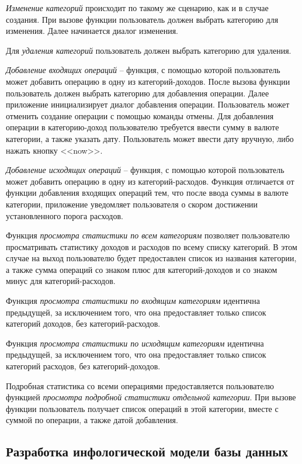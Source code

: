 \emph{Изменение категорий} происходит по такому же сценарию, как и в случае создания. При вызове функции пользователь должен выбрать категорию для изменения. Далее начинается диалог изменения.

Для \emph{удаления категорий} пользователь должен выбрать категорию для удаления.

\emph{Добавление входящих операций} -- функция, с помощью которой пользователь может добавить операцию в одну из категорий-доходов. После вызова функции пользователь должен выбрать категорию для добавления операции. Далее приложение инициализирует диалог добавления операции. Пользователь может отменить создание операции с помощью команды отмены. Для добавления операции в категорию-доход пользователю требуется ввести сумму в валюте категории, а также указать дату. Пользователь может ввести дату вручную, либо нажать кнопку <<now>>.

\emph{Добавление исходящих операций} -- функция, с помощью которой пользователь может добавить операцию в одну из категорий-расходов. Функция отличается от функции добавления входящих операций тем, что после ввода суммы в валюте категории, приложение уведомляет пользователя о скором достижении установленного порога расходов.

Функция \emph{просмотра статистики по всем категориям} позволяет пользователю просматривать статистику доходов и расходов по всему списку категорий. В этом случае на выход пользователю будет предоставлен список из названия категории, а также сумма операций со знаком плюс для категорий-доходов и со знаком минус для категорий-расходов.

Функция \emph{просмотра статистики по входящим категориям} идентична предыдущей, за исключением того, что она предоставляет только список категорий доходов, без категорий-расходов.

Функция \emph{просмотра статистики по исходящим категориям} идентична предыдущей, за исключением того, что она предоставляет только список категорий расходов, без категорий-доходов.

Подробная статистика со всеми операциями предоставляется пользователю функцией \emph{просмотра подробной статистики отдельной категории}. При вызове функции пользователь получает список операций в этой категории, вместе с суммой по операции, а также датой добавления.

\subsection{Разработка инфологической модели базы данных}
\label{sec:domain:model:db}

